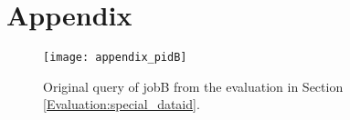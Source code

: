 \documentclass[draft,final]{vutinfth} %
\begin{document}

\chapter{Appendix}\label{Appendix}

\begin{figure}[h]
	\centering
	\texttt{[image: appendix\_pidB]}
	\caption{Original query of jobB from the evaluation in Section \ref{Evaluation:special_dataid}.}
	\label{fig:appendix_pidB} %
\end{figure}
\end{document}
